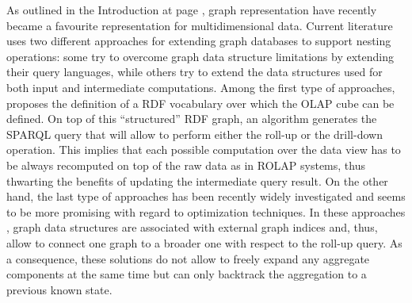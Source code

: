 As outlined in the Introduction at page \pageref{molap}, graph representation have recently became a favourite representation for multidimensional data. 
Current literature uses two different approaches for extending
graph databases to support nesting operations:
some try to overcome graph data structure limitations by extending their query languages, while others try to extend the data structures used for both input and intermediate computations. Among the first type of approaches, \cite{Etcheverry2012} proposes the definition of a RDF  vocabulary over which the OLAP  cube can be defined. On top of this ``structured'' RDF graph, an algorithm generates the SPARQL query that will allow to perform either the roll-up or the drill-down operation. This implies that each possible computation over the data view has to be always recomputed on top of the raw data as in ROLAP systems, thus thwarting the benefits of updating the intermediate query result. On the other hand, the last type of approaches has been recently widely investigated  and seems to be more promising with regard to optimization techniques. In these approaches \cite{Tian20085,ChenYZHY08,Qu2011}, graph data structures are associated with external graph indices and, thus, allow to connect one graph to a broader one with respect to the roll-up query. As a consequence, these solutions do not allow to freely expand any aggregate components at the same time but can only backtrack the aggregation to a previous known state.





